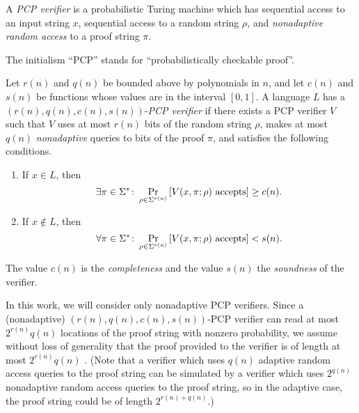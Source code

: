 \documentclass{article}
\begin{document}
\begin{definition}
  A \emph{PCP verifier} is a probabilistic Turing machine which has sequential access to an input string $x$, sequential access to a random string $\rho$, and \emph{nonadaptive random access} to a proof string $\pi$.
\end{definition}

The initialism ``PCP'' stands for ``probabilistically checkable proof''.

\begin{definition}
  Let $r(n)$ and $q(n)$ be bounded above by polynomials in $n$, and let $c(n)$ and $s(n)$ be functions whose values are in the interval $[0, 1]$.
  A language $L$ has a $(r(n), q(n), c(n), s(n))$-\emph{PCP verifier} if there exists a PCP verifier $V$ such that $V$ uses at most $r(n)$ bits of the random string $\rho$, makes at most $q(n)$ \emph{nonadaptive} queries to bits of the proof $\pi$, and satisfies the following conditions.
  \begin{enumerate}
  \item If $x \in L$, then
    \begin{equation*}
      \exists \pi \in \Sigma^* \colon \Pr_{\rho \in \Sigma^{r(n)}}{\left[V(x, \pi; \rho) \textnormal{ accepts}\right]} \geq c(n).
    \end{equation*}
  \item If $x \notin L$, then
    \begin{equation*}
      \forall \pi \in \Sigma^* \colon \Pr_{\rho \in \Sigma^{r(n)}}{\left[V(x, \pi; \rho) \textnormal{ accepts}\right]} < s(n).
    \end{equation*}
  \end{enumerate}
  The value $c(n)$ is the \emph{completeness} and the value $s(n)$ the \emph{soundness} of the verifier.
\end{definition}

In this work, we will consider only nonadaptive PCP verifiers.
Since a (nonadaptive) $(r(n), q(n), c(n), s(n))$-PCP verifier can read at most $2^{r(n)} q(n)$ locations of the proof string with nonzero probability, we assume without loss of generality that the proof provided to the verifier is of length at most $2^{r(n)} q(n)$ \cite[Remark~11.6]{ab09}.
(Note that a verifier which uses $q(n)$ adaptive random access queries to the proof string can be simulated by a verifier which uses $2^{q(n)}$ nonadaptive random access queries to the proof string, so in the adaptive case, the proof string could be of length $2^{r(n) + q(n)}$.)
\end{document}
